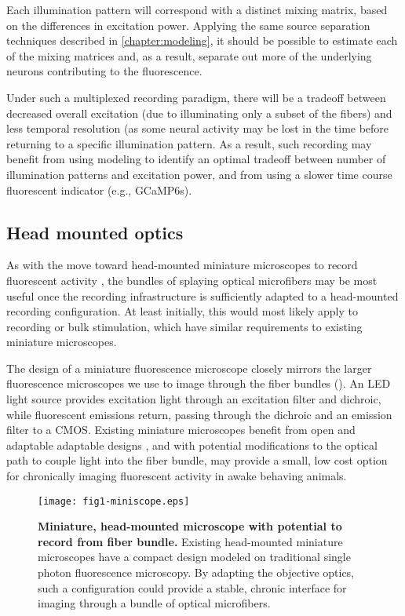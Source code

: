 Each illumination pattern will correspond with a 
distinct mixing matrix, based on the differences 
in excitation power. Applying the same source 
separation techniques described in 
\cref{chapter:modeling}, it should be possible 
to estimate each of the mixing matrices and, as 
a result, separate out more of the underlying 
neurons contributing to the fluorescence.

Under such a multiplexed recording paradigm, there 
will be a tradeoff between decreased overall 
excitation (due to illuminating only a subset of the 
fibers) and less temporal resolution (as some 
neural activity may be lost in the time before 
returning to a specific illumination pattern. 
As a result, such recording may benefit from using 
modeling to identify an optimal tradeoff between 
number of illumination patterns and excitation 
power, and from using a slower time course 
fluorescent indicator (e.g., GCaMP6s).

\subsection{Head mounted optics}

As with the move toward head-mounted miniature 
microscopes to record fluorescent activity 
\cite{Ghosh:2011ee,Cai:2016hm,LibertiIII:2017df}, 
the bundles of splaying optical microfibers may 
be most useful once the recording infrastructure 
is sufficiently adapted to a head-mounted 
recording configuration. At least initially, this 
would most likely apply to recording or bulk 
stimulation, which have similar requirements to 
existing miniature microscopes. 

The design of a miniature fluorescence microscope 
closely mirrors the larger fluorescence microscopes 
we use to image through the fiber bundles 
(). An LED light source 
provides excitation light through an excitation 
filter and dichroic, while fluorescent emissions 
return, passing through the dichroic and an 
emission filter to a CMOS. Existing miniature 
microscopes benefit from open and adaptable 
adaptable designs \cite{Cai:2016hm,LibertiIII:2017df},
and with potential modifications to the optical 
path to couple light into the fiber bundle, 
may provide a small, low cost option for 
chronically imaging fluorescent activity in awake
behaving animals.

\begin{figure}
\texttt{[image: fig1-miniscope.eps]}
\caption[Miniature microscope]{\textbf{Miniature, head-mounted 
microscope with potential to record from fiber bundle.} Existing 
head-mounted miniature microscopes have a compact design modeled 
on traditional single photon fluorescence microscopy. By 
adapting the objective optics, such a configuration could 
provide a stable, chronic interface for imaging through a bundle 
of optical microfibers. \cite{LibertiIII:2017df}}
\label{fig:miniscope}
\end{figure}

